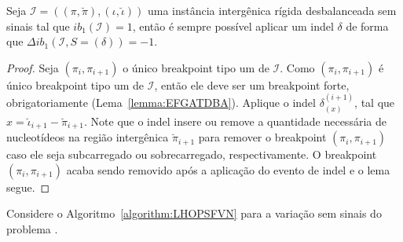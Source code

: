 \begin{lemma}\label{lemma:QNHGBLYF}
Seja $\mathcal{I}=((\pi,\breve\pi),(\iota,\breve\iota))$ uma instância intergênica rígida desbalanceada sem sinais tal que $ib_1(\mathcal{I}) = 1$, então é sempre possível aplicar um indel $\delta$ de forma que $\Delta ib_1(\mathcal{I}, S=(\delta)) = -1$.
\end{lemma}
\begin{proof}
Seja $(\pi_i,\pi_{i+1})$ o único breakpoint tipo um de $\mathcal{I}$. Como $(\pi_i,\pi_{i+1})$ é único breakpoint tipo um de $\mathcal{I}$, então ele deve ser um breakpoint forte, obrigatoriamente (Lema~\ref{lemma:EFGATDBA}). Aplique o indel $\delta_{(x)}^{(i+1)}$, tal que $x = \breve\iota_{i+1} - \breve\pi_{i+1}$. Note que o indel insere ou remove a quantidade necessária de nucleotídeos na região intergênica $\breve\pi_{i+1}$ para remover o breakpoint $(\pi_i,\pi_{i+1})$ caso ele seja subcarregado ou sobrecarregado, respectivamente. O breakpoint $(\pi_i,\pi_{i+1})$ acaba sendo removido após a aplicação do evento de indel e o lema segue.
\end{proof}

Considere o Algoritmo~\ref{algorithm:LHOPSFVN} para a variação sem sinais do problema \SbIRI{}.




